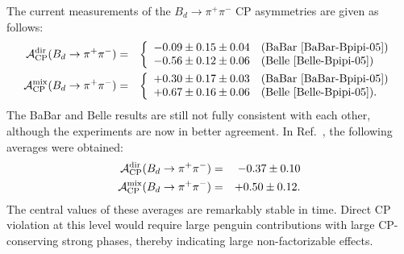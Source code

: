 \documentclass[12pt]{article}
\begin{document}
The current measurements of the $B_d\to\pi^+\pi^-$ CP asymmetries 
are given as follows:
\begin{eqnarray}
{\cal A}_{\rm CP}^{\rm dir}(B_d\to\pi^+\pi^-)
&=&\left\{
\begin{array}{ll}
-0.09\pm0.15\pm0.04 & \mbox{(BaBar \cite{BaBar-Bpipi-05})}\\
-0.56\pm0.12\pm0.06 & \mbox{(Belle \cite{Belle-Bpipi-05})}
\end{array}
\right.\label{Adir-exp}\\
{\cal A}_{\rm CP}^{\rm mix}(B_d\to\pi^+\pi^-)
&=&\left\{
\begin{array}{ll}
+0.30\pm0.17\pm0.03& \mbox{(BaBar \cite{BaBar-Bpipi-05})}\\
+0.67\pm0.16\pm0.06 & \mbox{(Belle \cite{Belle-Bpipi-05}).}
\end{array}
\right.\label{Amix-exp}
\end{eqnarray}
The BaBar and Belle results are still not fully consistent with each other, 
although the experiments are now in better agreement. In Ref.~\cite{HFAG}, 
the following averages were obtained:
\begin{eqnarray}
{\cal A}_{\rm CP}^{\rm dir}(B_d\to\pi^+\pi^-)&=&-0.37\pm0.10
\label{Bpipi-CP-averages}\\
{\cal A}_{\rm CP}^{\rm mix}(B_d\to\pi^+\pi^-)&=&+0.50\pm0.12.
\label{Bpipi-CP-averages2}
\end{eqnarray}
The central values of these averages are remarkably stable
in time. Direct CP violation at this level would require large penguin 
contributions with large CP-conserving strong phases, thereby indicating
large non-factorizable effects. 
\end{document}

